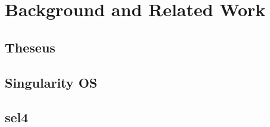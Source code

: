 
\chapter{Background and Related Work}

\label{Chapter2}


\section{Theseus}

\section{Singularity OS}

\section{sel4}

\section{}
